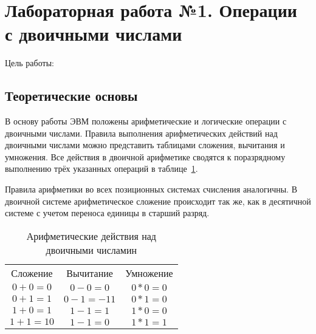 


%

\section{Лабораторная работа №1. Операции с двоичными числами}

Цель работы:

\subsection{Теоретические основы}

В основу работы ЭВМ положены арифметические и логические операции с двоичными числами. Правила выполнения арифметических действий над двоичными числами можно представить таблицами сложения, вычитания и умножения. Все действия в двоичной арифметике сводятся к поразрядному выполнению трёх указанных операций в таблице~\ref{tab:mytab}.

Правила арифметики во всех позиционных системах счисления аналогичны. В двоичной системе арифметическое сложение происходит так же, как в десятичной системе с учетом переноса единицы в старший разряд.

\begin{table}[h]
  \caption{Арифметические действия над двоичными числамин}
  \begin{center}\label{tab:mytab}
   \begin{tabular}{c|c|c}
     Сложение & Вычитание & Умножение \\
     $0 + 0 = 0$ & $0 - 0 = 0$ & $0 * 0 = 0$\\
     $0 + 1 = 1$ & $0 - 1 = -11$ & $0 * 1 = 0$\\
     $1 + 0 = 1$ & $1 - 1 = 1$ & $1 * 0 = 0$\\
     $1 + 1 = 10$ & $1 - 1 = 0$ & $1 * 1 = 1$\\
     \end{tabular}
  \end{center}       
\end{table}

